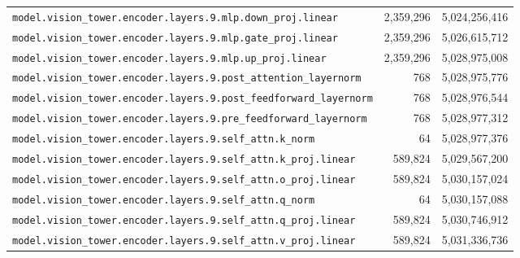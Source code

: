 \documentclass[10pt,a4paper]{article}
\theoremstyle{definition}
\begin{document}
\begin{appendices}
\begin{longtable}{p{9.5cm}rr}
\texttt{model.\allowbreak{}vision\_tower.\allowbreak{}encoder.\allowbreak{}layers.\allowbreak{}9.\allowbreak{}mlp.\allowbreak{}down\_proj.\allowbreak{}linear} & 2,359,296 & 5,024,256,416 \\
\texttt{model.\allowbreak{}vision\_tower.\allowbreak{}encoder.\allowbreak{}layers.\allowbreak{}9.\allowbreak{}mlp.\allowbreak{}gate\_proj.\allowbreak{}linear} & 2,359,296 & 5,026,615,712 \\
\texttt{model.\allowbreak{}vision\_tower.\allowbreak{}encoder.\allowbreak{}layers.\allowbreak{}9.\allowbreak{}mlp.\allowbreak{}up\_proj.\allowbreak{}linear} & 2,359,296 & 5,028,975,008 \\
\texttt{model.\allowbreak{}vision\_tower.\allowbreak{}encoder.\allowbreak{}layers.\allowbreak{}9.\allowbreak{}post\_attention\_layernorm} & 768 & 5,028,975,776 \\
\texttt{model.\allowbreak{}vision\_tower.\allowbreak{}encoder.\allowbreak{}layers.\allowbreak{}9.\allowbreak{}post\_feedforward\_layernorm} & 768 & 5,028,976,544 \\
\texttt{model.\allowbreak{}vision\_tower.\allowbreak{}encoder.\allowbreak{}layers.\allowbreak{}9.\allowbreak{}pre\_feedforward\_layernorm} & 768 & 5,028,977,312 \\
\texttt{model.\allowbreak{}vision\_tower.\allowbreak{}encoder.\allowbreak{}layers.\allowbreak{}9.\allowbreak{}self\_attn.\allowbreak{}k\_norm} & 64 & 5,028,977,376 \\
\texttt{model.\allowbreak{}vision\_tower.\allowbreak{}encoder.\allowbreak{}layers.\allowbreak{}9.\allowbreak{}self\_attn.\allowbreak{}k\_proj.\allowbreak{}linear} & 589,824 & 5,029,567,200 \\
\texttt{model.\allowbreak{}vision\_tower.\allowbreak{}encoder.\allowbreak{}layers.\allowbreak{}9.\allowbreak{}self\_attn.\allowbreak{}o\_proj.\allowbreak{}linear} & 589,824 & 5,030,157,024 \\
\texttt{model.\allowbreak{}vision\_tower.\allowbreak{}encoder.\allowbreak{}layers.\allowbreak{}9.\allowbreak{}self\_attn.\allowbreak{}q\_norm} & 64 & 5,030,157,088 \\
\texttt{model.\allowbreak{}vision\_tower.\allowbreak{}encoder.\allowbreak{}layers.\allowbreak{}9.\allowbreak{}self\_attn.\allowbreak{}q\_proj.\allowbreak{}linear} & 589,824 & 5,030,746,912 \\
\texttt{model.\allowbreak{}vision\_tower.\allowbreak{}encoder.\allowbreak{}layers.\allowbreak{}9.\allowbreak{}self\_attn.\allowbreak{}v\_proj.\allowbreak{}linear} & 589,824 & 5,031,336,736 \\

\end{longtable}
\end{appendices}
\end{document}
